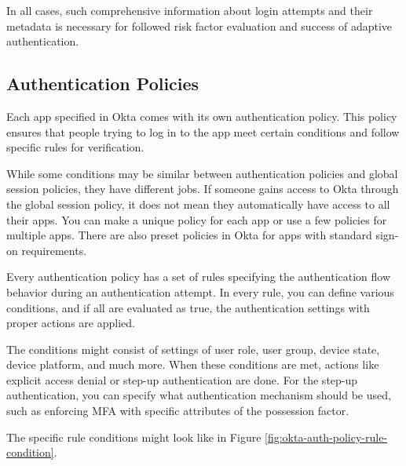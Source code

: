 In all cases, such comprehensive information about login attempts and their metadata is necessary for followed risk factor evaluation and success of adaptive authentication. 

\subsection*{Authentication Policies}
Each app specified in Okta comes with its own authentication policy.
This policy ensures that people trying to log in to the app meet certain conditions and follow specific rules for verification.

While some conditions may be similar between authentication policies and global session policies, they have different jobs. 
If someone gains access to Okta through the global session policy, it does not mean they automatically have access to all their apps.
You can make a unique policy for each app or use a few policies for multiple apps.
There are also preset policies in Okta for apps with standard sign-on requirements.

Every authentication policy has a set of rules specifying the authentication flow behavior during an authentication attempt.
In every rule, you can define various conditions, and if all are evaluated as true, the authentication settings with proper actions are applied.

The conditions might consist of settings of user role, user group, device state, device platform, and much more.
When these conditions are met, actions like explicit access denial or step-up authentication are done.
For the step-up authentication, you can specify what authentication mechanism should be used, such as enforcing MFA with specific attributes of the possession factor.

The specific rule conditions might look like in Figure \ref{fig:okta-auth-policy-rule-condition}.

